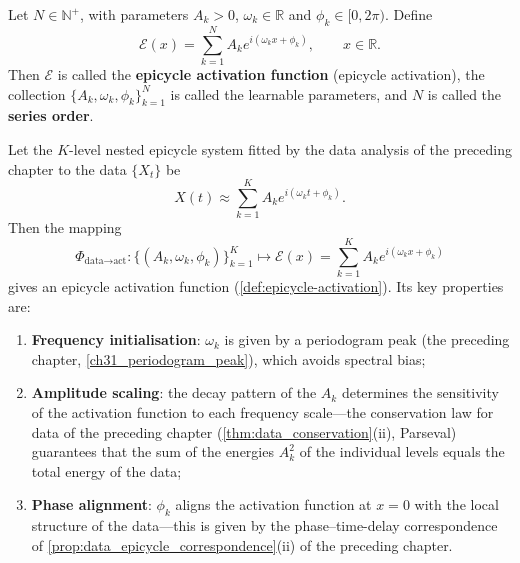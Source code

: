 \begin{definition}\label{def:epicycle-activation}
Let $N\in\mathbb N^+$, with parameters $A_k>0$, $\omega_k\in\mathbb R$ and $\phi_k\in[0,2\pi)$. Define
\[
\boxed{\ \mathcal E(x)=\sum_{k=1}^{N}A_k e^{i(\omega_k x+\phi_k)},\qquad x\in\mathbb R.\ }
\]
Then $\mathcal E$ is called the \textbf{epicycle activation function} (epicycle activation), the collection $\{A_k,\omega_k,\phi_k\}_{k=1}^{N}$ is called the learnable parameters, and $N$ is called the \textbf{series order}.
\end{definition}

\begin{proposition}\label{prop:data_to_activation_map}
Let the $K$-level nested epicycle system fitted by the data analysis of the preceding chapter to the data $\{X_t\}$ be
\[
X(t) \approx \sum_{k=1}^{K} A_k e^{i(\omega_k t + \phi_k)}.
\]
Then the mapping
\[
\Phi_{\text{data}\to\text{act}}: \{(A_k,\omega_k,\phi_k)\}_{k=1}^{K} \longmapsto \mathcal{E}(x) = \sum_{k=1}^{K} A_k e^{i(\omega_k x + \phi_k)}
\]
gives an epicycle activation function (\cref{def:epicycle-activation}). Its key properties are:
\begin{enumerate}[label=(\roman*)]
    \item \textbf{Frequency initialisation}: $\omega_k$ is given by a periodogram peak (the preceding chapter, \cref{ch31_periodogram_peak}), which avoids spectral bias;
    \item \textbf{Amplitude scaling}: the decay pattern of the $A_k$ determines the sensitivity of the activation function to each frequency scale---the conservation law for data of the preceding chapter (\cref{thm:data_conservation}(ii), Parseval) guarantees that the sum of the energies $A_k^2$ of the individual levels equals the total energy of the data;
    \item \textbf{Phase alignment}: $\phi_k$ aligns the activation function at $x=0$ with the local structure of the data---this is given by the phase--time-delay correspondence of \cref{prop:data_epicycle_correspondence}(ii) of the preceding chapter.
\end{enumerate}
\end{proposition}

